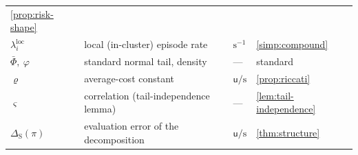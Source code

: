 \documentclass[11pt, a4paper]{article}
\theoremstyle{definition}
\theoremstyle{plain}
\theoremstyle{remark}
\begin{document}
\begin{table}[h!]
\begin{tabular}{@{}llll@{}}
  \cref{prop:risk-shape} \\
$\lambda_i^{\mathrm{loc}}$ & local (in-cluster) episode rate &
  $\mathrm{s}^{-1}$ & \cref{simp:compound} \\
$\bar\Phi,\ \varphi$ & standard normal tail, density & --- & standard \\
$\varrho$ & average-cost constant & $\mathsf{u}/\mathrm{s}$ &
  \cref{prop:riccati} \\
$\varsigma$ & correlation (tail-independence lemma) & --- &
  \cref{lem:tail-independence} \\
$\Delta_{\mathrm{S}}(\pi)$ & evaluation error of the decomposition &
  $\mathsf{u}/\mathrm{s}$ & \cref{thm:structure} \\
\bottomrule
\end{tabular}
\end{table}
\end{document}
